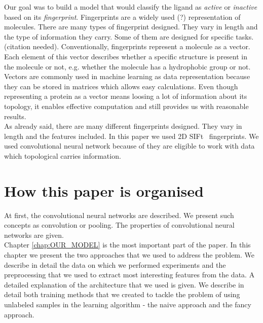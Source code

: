 \documentclass[a4paper,10pt]{report}
\begin{document}
    Our goal was to build a model that would classify the ligand as \emph{active} or \emph{inactive} based on its \emph{fingerprint}. Fingerprints are a widely used (?) representation of molecules. There are many types of fingerprint designed. They vary in length and the type of information they carry. Some of them are designed for specific tasks. (citation needed). Conventionally, fingerprints represent a molecule as a vector. Each element of this vector describes whether a specific structure is present in the molecule or not, e.g. whether the molecule has a hydrophobic group or not.\\
    
    
    Vectors are commonly used in machine learning as data representation because they can be stored in matrices which allows easy calculations. Even though representing a protein as a vector means loosing a lot of information about its topology, it enables effective computation and still provides us with reasonable results.\\
    
    As already said, there are many different fingerprints designed. They vary in length and the features included. In this paper we used 2D SIFt~\cite{2DSIFT} fingerprints. %
    We used convolutional neural network because of they are eligible to work with data which topological carries information.
     
   
    \section{How this paper is organised}
    
    At first, the convolutional neural networks are described. We present such concepts as convolution or pooling. The properties of convolutional neural networks are given.\\
    
    Chapter \ref{chap:OUR_MODEL} is the most important part of the paper. In this chapter we present the two approaches that we used to address the problem. We describe in detail the data on which we performed experiments and the preprocessing that we used to extract most interesting features from the data. A detailed explanation of the architecture that we used is given. We describe in detail both training methods that we created to tackle the problem of using unlabeled samples in the learning algorithm - the naive approach and the fancy approach.\\
    
\end{document}
